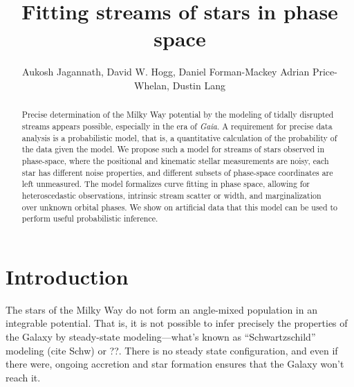 \documentclass[12pt,preprint]{aastex}
\newcounter{address}
\begin{document}
\title{Fitting streams of stars in phase space}
\author{Aukosh Jagannath\altaffilmark{\ref{CCPP}},
        David W. Hogg\altaffilmark{\ref{CCPP},\ref{MPIA},\ref{email}},
	Daniel Forman-Mackey\altaffilmark{\ref{CCPP}}
        Adrian Price-Whelan\altaffilmark{\ref{CCPP}},
        Dustin Lang\altaffilmark{\ref{Princeton}}}
\setcounter{address}{1}

\begin{abstract}
Precise determination of the Milky Way potential by the modeling of
tidally disrupted streams appears possible, especially in the era of
\textsl{Gaia}.  A requirement for precise data analysis is a
probabilistic model, that is, a quantitative calculation of the
probability of the data given the model.  We propose such a model for
streams of stars observed in phase-space, where the positional and
kinematic stellar measurements are noisy, each star has different
noise properties, and different subsets of phase-space coordinates are left
unmeasured.  The model formalizes curve fitting in phase space,
allowing for heteroscedastic observations, intrinsic stream scatter or
width, and marginalization over unknown orbital phases.  We show on
artificial data that this model can be used to perform useful
probabilistic inference.
\end{abstract}


\section{Introduction}

The stars of the Milky Way do not form an angle-mixed population in an
integrable potential.  That is, it is not possible to infer precisely
the properties of the Galaxy by steady-state modeling---what's known
as ``Schwartzschild'' modeling (cite Schw) or ??.  There is no steady
state configuration, and even if there were, ongoing accretion and
star formation ensures that the Galaxy won't reach it.
\end{document}
